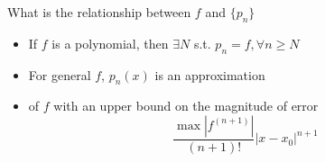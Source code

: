\begin{remark}
    What is the relationship between $f$ and 
    $\{ p_n \} $
    \begin{itemize}
        \item If $f$ is a polynomial, then $\exists N$
        s.t. $p_n = f, \forall n \geq N$
        \item For general $f$, $p_n(x)$ is an approximation
        \item of $f$ with an upper bound on the magnitude
        of error
        \[
            \frac{
                \max \left| f^{(n+1)} \right| 
            }{
                (n+1)!
            } 
            \left| x - x_0 \right|^{n + 1}
        \]
        
    \end{itemize} 
\end{remark}

